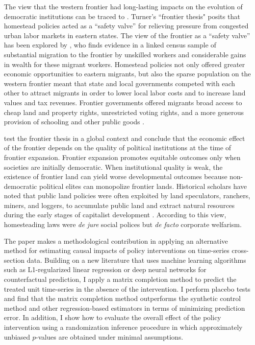 The view that the western frontier had long-lasting impacts on the evolution of democratic institutions can be traced to \citet{turner1956significance}. Turner's ``frontier thesis" posits that homestead policies acted as a ``safety valve'' for relieving pressure from congested urban labor markets in eastern states. The view of the frontier as a ``safety valve'' has been explored by \citet{ferrie1997migration}, who finds evidence in a linked census sample of substantial migration to the frontier by unskilled workers and considerable gains in wealth for these migrant workers. Homestead policies not only offered greater economic opportunities to eastern migrants, but also the sparse population on the western frontier meant that state and local governments competed with each other to attract migrants in order to lower local labor costs and to increase land values and tax revenues. Frontier governments offered migrants broad access to cheap land and property rights, unrestricted voting rights, and a more generous provision of schooling and other public goods \citep{engerman2005evolution}.

\citet{garcia2008myth} test the frontier thesis in a global context and conclude that the economic effect of the frontier depends on the quality of political institutions at the time of frontier expansion. Frontier expansion promotes equitable outcomes only when societies are initially democratic. When institutional quality is weak, the existence of frontier land can yield worse developmental outcomes because non-democratic political elites can monopolize frontier lands. Historical scholars have noted that public land policies were often exploited by land speculators, ranchers, miners, and loggers, to accumulate public land and extract natural resources during the early stages of capitalist development \citep{gates1942role,murtazashvili2013political}. According to this view, homesteading laws were \emph{de jure} social polices but \emph{de facto} corporate welfarism. 

The paper makes a methodological contribution in applying an alternative method for estimating causal impacts of policy interventions on time-series cross-section data. Building on a new literature that uses machine learning algorithms such as L1-regularized linear regression \citep{doudchenko2016balancing} or deep neural networks \citep{poulos2017rnn} for counterfactual prediction, I apply a matrix completion method to predict the treated unit time-series in the absence of the intervention. I perform placebo tests and find that the matrix completion method outperforms the synthetic control method and other regression-based estimators in terms of minimizing prediction error. In addition, I show how to evaluate the overall effect of the policy intervention using a randomization inference procedure in which approximately unbiased $p$-values are obtained under minimal assumptions.

